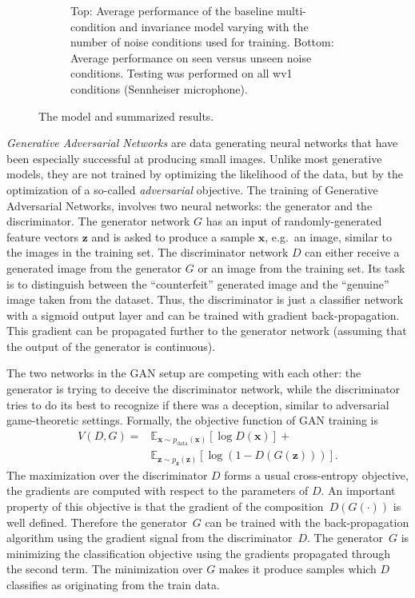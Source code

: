 \documentclass[a4paper]{article}
\begin{document}
\begin{figure}
\begin{subfigure}[b]{0.5\linewidth}
        \caption{Top: Average performance of the baseline multi-condition and invariance model varying with  the number of noise
            conditions used for training. Bottom: Average performance on seen versus unseen noise conditions.
            Testing was performed on all wv1 conditions (Sennheiser microphone).
            }
        \label{fig:results}
    \end{subfigure}
    \caption{The model and summarized results.}
\end{figure}
\emph{Generative Adversarial Networks} are data generating neural networks that
    have been especially successful at producing small images.
    Unlike most generative models, they are not trained by optimizing the
    likelihood of the data, but by the optimization of a so-called
    \emph{adversarial} objective. The training of Generative Adversarial
    Networks, involves two neural networks: the generator and the discriminator. 
    The generator network $G$ has an
    input of randomly-generated feature vectors $\bm{z}$ and is asked to produce a
    sample $\bm{x}$, e.g.\ an image, similar to the images in the training set. The discriminator network $D$
    can either receive a generated image from the generator $G$ or an image
    from the training set. Its task is to distinguish
    between the ``counterfeit'' generated image and the ``genuine'' image taken from the dataset. Thus,
    the discriminator is just a classifier network with a sigmoid output layer
    and can be trained with gradient back-propagation. This gradient can be propagated further
    to the generator network (assuming that the output of the generator is
    continuous).

    The two networks in the GAN setup are competing with each other: the 
    generator is trying to deceive the discriminator network, while the discriminator tries
    to do its best to recognize if there was a deception, similar to adversarial game-theoretic settings.    
    Formally, the objective function of GAN training is
    \begin{align}
        V(D, G) = &\mathbb{E}_{\bm{x} \sim p_{\text{data}}(\bm{x})}[\log D(\bm{x})] + \\
            &\mathbb{E}_{\bm{z} \sim p_{\bm{z}}(\bm{z})}[\log (1 - D(G(\bm{z})))].
        \label{eq:gan}
    \end{align}
    The maximization over the discriminator $D$ forms a usual cross-entropy objective, the gradients are
    computed with respect to the parameters of $D$. An important property of
    this objective is that the gradient of the composition~$D(G(\cdot))$ is well
    defined. Therefore the generator~$G$ can be trained with the back-propagation
    algorithm using the gradient signal from the discriminator~$D$.
    The generator~$G$ is
    minimizing the classification objective using the gradients
    propagated through the second term. The minimization over $G$ makes it
    produce samples which $D$ classifies as originating from the train data.
\end{document}
